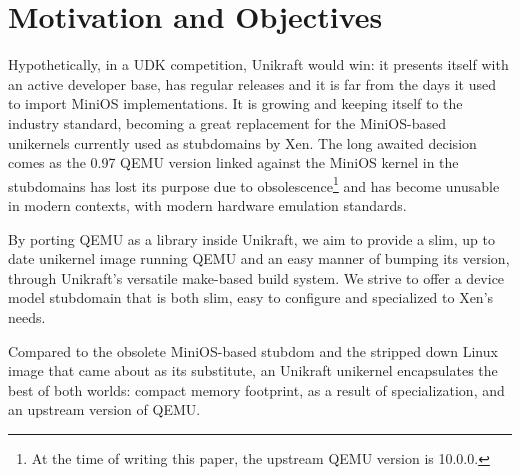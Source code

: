 \chapter{Motivation and Objectives}
\label{chapter:motivation-objectives}

Hypothetically, in a UDK competition, Unikraft would win: it presents itself with an active developer base, has regular releases and it is far from the days it used to import MiniOS implementations.
It is growing and keeping itself to the industry standard, becoming a great replacement for the MiniOS-based unikernels currently used as stubdomains by Xen.
The long awaited decision comes as the 0.97 QEMU version linked against the MiniOS kernel in the stubdomains has lost its purpose due to obsolescence\footnote{At the time of writing this paper, the upstream QEMU version is 10.0.0.} and has become unusable in modern contexts, with modern hardware emulation standards.

By porting QEMU as a library inside Unikraft, we aim to provide a slim, up to date unikernel image running QEMU and an easy manner of bumping its version, through Unikraft's versatile make-based build system.
We strive to offer a device model stubdomain that is both slim, easy to configure and specialized to Xen's needs.

Compared to the obsolete MiniOS-based stubdom and the stripped down Linux image that came about as its substitute, an Unikraft unikernel encapsulates the best of both worlds: compact memory footprint, as a result of specialization, and an upstream version of QEMU.
